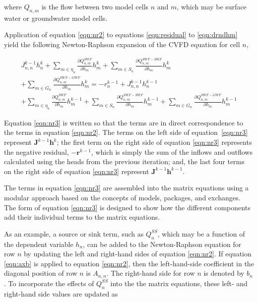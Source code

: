 \documentclass[fleqn]{article}
\newcommand{\matr}[1]{\mathbf{#1}}
\begin{document}
\noindent where $Q_{n,m}$ is the flow between two model cells $n$ and $m$, which may be surface water or groundwater model cells.

Application of equation \ref{eqn:nr2} to equations \ref{eqn:residual} to \ref{eqn:drndhm} yield the following Newton-Raphson expansion of the CVFD equation for cell $n$,

\begin{equation}
\label{eqn:nr3}
\begin{split}
J_{n,n}^{k-1} h_n^k
+ \sum \limits_{m \in \eta_{n}} \frac{\partial Q_{n,m}^{SWF}}{\partial h_m} h_m^k
+ \sum \limits_{m \in S_{n}} \frac{\partial Q_{n,m}^{SWF-SWF}}{\partial h_m} h_m^k \\
+ \sum \limits_{m \in G_{n}} \frac{\partial Q_{n,m}^{SWF-GWF}}{\partial h_m} h_m^k 
= 
-r_n^{k-1}
+ J_{n,n}^{k-1} h_n^{k-1} \\
+ \sum \limits_{m \in \eta_{n}} \frac{\partial Q_{n,m}^{SWF}}{\partial h_m} h_m^{k-1}
+ \sum \limits_{m \in S_{n}} \frac{\partial Q_{n,m}^{SWF-SWF}}{\partial h_m} h_m^{k-1}
+ \sum \limits_{m \in G_{n}} \frac{\partial Q_{n,m}^{SWF-GWF}}{\partial h_m} h_m^{k-1}
\end{split}
\end{equation}

\noindent Equation \ref{eqn:nr3} is written so that the terms are in direct correspondence to the terms in equation \ref{eqn:nr2}.  The terms on the left side of equation~\ref{eqn:nr3} represent $\matr{J}^{k-1} \matr{h}^{k}$; the first term on the right side of equation \ref{eqn:nr3} represents the negative residual, $-\matr{r}^{k-1}$, which is simply the sum of the inflows and outflows calculated using the heads from the previous iteration; and, the last four terms on the right side of equation \ref{eqn:nr3} represent $\matr{J}^{k-1} \matr{h}^{k-1}$.  

The terms in equation \ref{eqn:nr3} are assembled into the matrix equations using a modular approach based on the concepts of models, packages, and exchanges.  The form of equation \ref{eqn:nr3} is designed to show how the different components add their individual terms to the matrix equations.  

As an example, a source or sink term, such as $Q_n^{SS}$, which may be a function of the dependent variable $h_n$, can be added to the Newton-Raphson equation for row $n$ by updating the left and right-hand sides of equation \ref{eqn:nr2}.  If equation \ref{eqn:axb} is applied to equation \ref{eqn:nr2}, then the left-hand-side coefficient in the diagonal position of row $n$ is $A_{n,n}$.  The right-hand side for row $n$ is denoted by $b_n$.  To incorporate the effects of $Q_n^{SS}$ into the the matrix equations, these left- and right-hand side values are updated as
\end{document}
